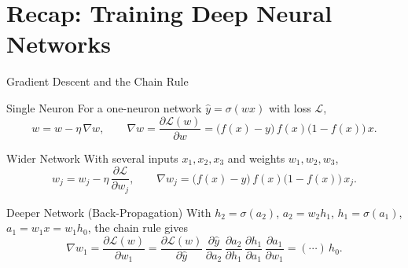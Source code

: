 \documentclass{beamer}
\begin{document}
\section{Recap: Training Deep Neural Networks}

\begin{frame}[shrink=10]{Gradient Descent and the Chain Rule}
  \begin{block}{Single Neuron}
    For a one-neuron network $\hat y = \sigma(wx)$ with loss $\mathcal L$,
    \[
      w = w - \eta\,\nabla w,
      \qquad
      \nabla w = \frac{\partial \mathcal L(w)}{\partial w}
        = \bigl(f(x)-y\bigr)\,f(x)\bigl(1-f(x)\bigr)\,x .
    \]
  \end{block}

  \begin{block}{Wider Network}
    With several inputs $x_1,x_2,x_3$ and weights $w_1,w_2,w_3$,
    \[
      w_j = w_j - \eta\,\frac{\partial \mathcal L}{\partial w_j},
      \qquad
      \nabla w_j = \bigl(f(x)-y\bigr)\,f(x)\bigl(1-f(x)\bigr)\,x_j .
    \]
  \end{block}

  \begin{block}{Deeper Network (Back-Propagation)}
    With $h_2 = \sigma(a_2)$, $a_2 = w_2 h_1$, $h_1 = \sigma(a_1)$,
    $a_1 = w_1 x = w_1 h_0$, the chain rule gives
    \[
      \nabla w_1 = \frac{\partial \mathcal L(w)}{\partial w_1}
        = \frac{\partial \mathcal L(w)}{\partial \hat y}\,
          \frac{\partial \hat y}{\partial a_2}\,
          \frac{\partial a_2}{\partial h_1}\,
          \frac{\partial h_1}{\partial a_1}\,
          \frac{\partial a_1}{\partial w_1}
        = (\cdots)\,h_0 .
    \]
  \end{block}
\end{frame}
\end{document}

